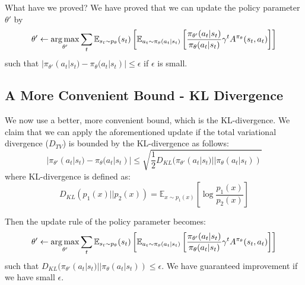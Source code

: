 What have we proved? We have proved that we can update the policy parameter $\theta'$ by
$$\theta' \leftarrow \operatorname*{arg\,max}_{\theta'} \sum_t \mathbb{E}_{s_t\sim p_{\theta}}(s_t)\left[\mathbb{E}_{a_t\sim \pi_\theta(a_t|s_t)}\left[\frac{\pi_{\theta'}(a_t|s_t)}{\pi_\theta(a_t|s_t)}\gamma^t A^{\pi_\theta}(s_t,a_t)\right]\right]$$
such that $|\pi_{\theta'}(a_t|s_t) - \pi_{\theta}(a_t|s_t)|\leq \epsilon$ if $\epsilon$ is small.

\subsection{A More Convenient Bound - KL Divergence}
We now use a better, more convenient bound, which is the KL-divergence. We claim that we can apply the aforementioned update if the total variational divergence ($D_{TV}$) is bounded by the KL-divergence as follows:
$$|\pi_{\theta'}(a_t|s_t) - \pi_{\theta}(a_t|s_t)|\leq \sqrt{\frac{1}{2}D_{KL}(\pi_{\theta'}(a_t|s_t)||\pi_{\theta}(a_t|s_t))}$$
where KL-divergence is defined as:
$$D_{KL}(p_1(x)||p_2(x)) = \mathbb{E}_{x\sim p_1(x)}\left[\log\frac{p_1(x)}{p_2(x)}\right]$$

Then the update rule of the policy parameter becomes:
$$\theta' \leftarrow \operatorname*{arg\,max}_{\theta'} \sum_t \mathbb{E}_{s_t\sim p_{\theta}}(s_t)\left[\mathbb{E}_{a_t\sim \pi_\theta(a_t|s_t)}\left[\frac{\pi_{\theta'}(a_t|s_t)}{\pi_\theta(a_t|s_t)}\gamma^t A^{\pi_\theta}(s_t,a_t)\right]\right]$$
such that $D_{KL}(\pi_{\theta'}(a_t|s_t)||\pi_{\theta}(a_t|s_t))\leq \epsilon$. We have guaranteed improvement if we have small $\epsilon$.

